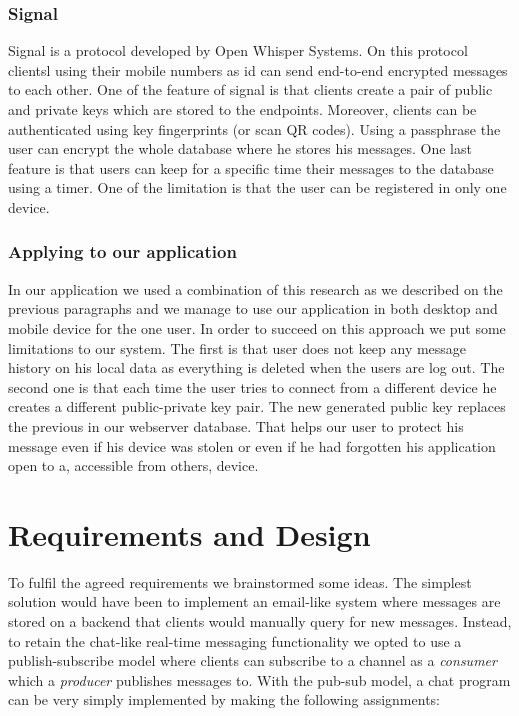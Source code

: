 \documentclass[11pt,a4paper]{report}
\begin{document}
\subsection{Signal}
Signal is a protocol developed by Open Whisper Systems. On this protocol clientsl using their mobile numbers as id can send end-to-end encrypted messages to each other. One of the feature of signal is that clients create a pair of public and private keys which are stored to the endpoints. Moreover, clients can be authenticated using key fingerprints (or scan QR codes). Using a passphrase the user can encrypt the whole database where he stores his messages. One last feature is that users can keep for a specific time their messages to the database using a timer. One of the limitation is that the user can be registered in only one device.

\subsection{Applying to our application}
In our application we used a combination of this research as we described on the previous paragraphs and we manage to use our application in both desktop and mobile device for the one user. In order to succeed on this approach we put some limitations to our system. The first is that user does not keep any message history on his local data as everything is deleted when the users are log out. The second one is that each time the user tries to connect from a different device he creates a different public-private key pair. The new generated public key replaces the previous in our webserver database. That helps our user to protect his message even if his device was stolen or even if he had forgotten his application open to a, accessible from others, device.



\chapter{Requirements and Design}


To fulfil the agreed requirements we brainstormed some ideas. The simplest solution would have been to implement an email-like system where messages are stored on a backend that clients would manually query for new messages. Instead, to retain the chat-like real-time messaging functionality we opted to use a publish-subscribe model where clients can subscribe to a channel as a \emph{consumer} which a \emph{producer} publishes messages to. With the pub-sub model, a chat program can be very simply implemented by making the following assignments:
\end{document}
